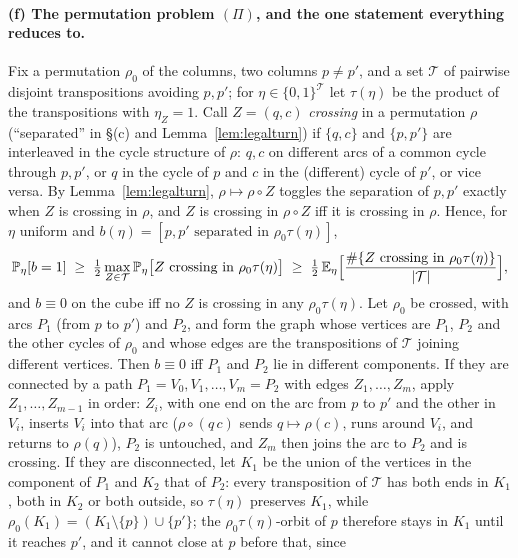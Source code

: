 \paragraph{(f) The permutation problem $(\Pi)$, and the one statement
everything reduces to.}  Fix a permutation $\rho_0$ of the columns,
two columns $p\ne p'$, and a set $\mathcal T$ of pairwise disjoint
transpositions avoiding $p,p'$; for $\eta\in\{0,1\}^{\mathcal T}$ let
$\tau(\eta)$ be the product of the transpositions with $\eta_Z=1$.
Call $Z=(q,c)$ \emph{crossing} in a permutation $\rho$ (``separated''
in \S(c) and Lemma~\ref{lem:legalturn}) if $\{q,c\}$ and
$\{p,p'\}$ are interleaved in the cycle structure of $\rho$: $q,c$ on
different arcs of a common cycle through $p,p'$, or $q$ in the cycle
of $p$ and $c$ in the (different) cycle of $p'$, or vice versa.  By
Lemma~\ref{lem:legalturn}, $\rho\mapsto\rho\circ Z$ toggles the
separation of $p,p'$ exactly when $Z$ is crossing in $\rho$, and $Z$
is crossing in $\rho\circ Z$ iff it is crossing in $\rho$.  Hence, for
$\eta$ uniform and $b(\eta)=[p,p'\text{ separated in }\rho_0\tau(\eta)]$,
\begin{equation}\label{eq:Pi}
\mathbb{P}_\eta[b=1]\;\ge\;\tfrac12\max_{Z\in\mathcal T}\mathbb{P}_\eta\bigl[Z\text{ crossing in }\rho_0\tau(\eta)\bigr]
\;\ge\;\tfrac12\,\mathbb{E}_\eta\Bigl[\frac{\#\{Z\text{ crossing in }\rho_0\tau(\eta)\}}{|\mathcal T|}\Bigr],
\end{equation}
and $b\equiv0$ on the cube iff no $Z$ is crossing in any
$\rho_0\tau(\eta)$.  Let $\rho_0$ be crossed, with arcs $P_1$ (from
$p$ to $p'$) and $P_2$, and form the graph whose vertices are $P_1$,
$P_2$ and the other cycles of $\rho_0$ and whose edges are the
transpositions of $\mathcal T$ joining different vertices.  Then
$b\equiv0$ iff $P_1$ and $P_2$ lie in different components.  If they
are connected by a path $P_1=V_0,V_1,\dots,V_m=P_2$ with edges
$Z_1,\dots,Z_m$, apply $Z_1,\dots,Z_{m-1}$ in order: $Z_i$, with one
end on the arc from $p$ to $p'$ and the other in $V_i$, inserts $V_i$
into that arc ($\rho\circ(q\,c)$ sends $q\mapsto\rho(c)$, runs around
$V_i$, and returns to $\rho(q)$), $P_2$ is untouched, and $Z_m$ then
joins the arc to $P_2$ and is crossing.  If they are disconnected, let
$K_1$ be the union of the vertices in the component of $P_1$ and $K_2$
that of $P_2$: every transposition of $\mathcal T$ has both ends in
$K_1$, both in $K_2$ or both outside, so $\tau(\eta)$ preserves $K_1$,
while $\rho_0(K_1)=(K_1\setminus\{p\})\cup\{p'\}$; the
$\rho_0\tau(\eta)$-orbit of $p$ therefore stays in $K_1$ until it
reaches $p'$, and it cannot close at $p$ before that, since
